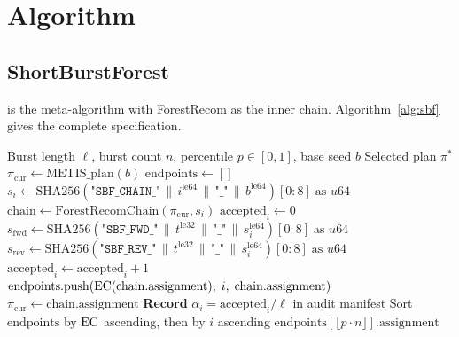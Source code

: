 \section{Algorithm}
\label{sec:algorithm}

\subsection{ShortBurstForest}
\label{subsec:alg-sbf}

\sbf{} is the \sburst{} meta-algorithm with ForestRecom as the inner chain.
Algorithm~\ref{alg:sbf} gives the complete specification.

\begin{algorithm}
\caption{\sbf{}}
\label{alg:sbf}
\begin{algorithmic}[1]
\Require Burst length $\ell$, burst count $n$, percentile $p \in [0,1]$,
         base seed $b$
\Ensure  Selected plan $\pi^*$
\State $\pi_{\mathrm{cur}} \gets \mathrm{METIS\_plan}(b)$
\State $\mathrm{endpoints} \gets []$
  \State $s_i \gets \mathrm{SHA256}\!\left(\texttt{"SBF\_CHAIN\_"} \,\|\,
         i^{\mathrm{le64}} \,\|\, \texttt{"\_"} \,\|\, b^{\mathrm{le64}}
         \right)[0{:}8]\;\text{as } u64$
  \State $\mathrm{chain} \gets \mathrm{ForestRecomChain}(\pi_{\mathrm{cur}}, s_i)$
  \State $\mathrm{accepted}_i \gets 0$
    \State $s_{\mathrm{fwd}} \gets \mathrm{SHA256}\!\left(\texttt{"SBF\_FWD\_"} \,\|\,
           t^{\mathrm{le32}} \,\|\, \texttt{"\_"} \,\|\, s_i^{\mathrm{le64}}
           \right)[0{:}8]\;\text{as } u64$
    \State $s_{\mathrm{rev}} \gets \mathrm{SHA256}\!\left(\texttt{"SBF\_REV\_"} \,\|\,
           t^{\mathrm{le32}} \,\|\, \texttt{"\_"} \,\|\, s_i^{\mathrm{le64}}
           \right)[0{:}8]\;\text{as } u64$
      \State $\mathrm{accepted}_i \gets \mathrm{accepted}_i + 1$
    \EndIf
  \EndFor
  \State $\mathrm{endpoints}.\mathrm{push}\!\left(
         \mathrm{EC}(\mathrm{chain.assignment}),\; i,\; \mathrm{chain.assignment}
         \right)$
  \State $\pi_{\mathrm{cur}} \gets \mathrm{chain.assignment}$
  \State \textbf{Record} $\alpha_i = \mathrm{accepted}_i / \ell$ in audit manifest
\EndFor
\State Sort $\mathrm{endpoints}$ by $\mathrm{EC}$ ascending, then by $i$ ascending
\State \Return $\mathrm{endpoints}[\lfloor p \cdot n \rfloor].\mathrm{assignment}$
\end{algorithmic}
\end{algorithm}

